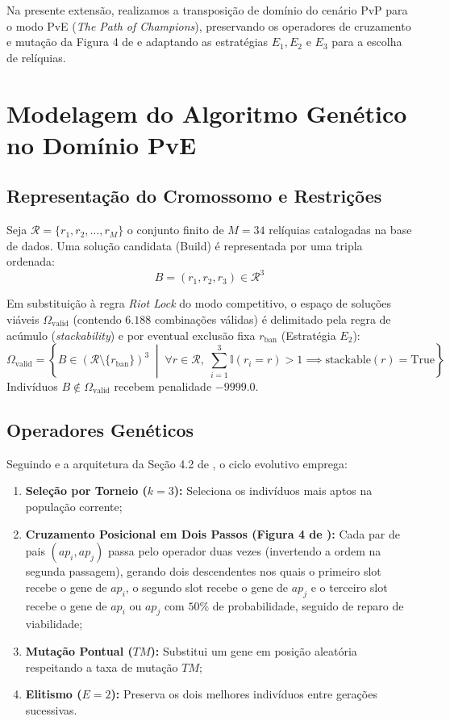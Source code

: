 \documentclass[12pt]{article}
\begin{document}
Na presente extensão, realizamos a transposição de domínio do cenário PvP para o modo PvE (\textit{The Path of Champions}), preservando os operadores de cruzamento e mutação da Figura 4 de \cite{balbinot2024} e adaptando as estratégias $E_1, E_2$ e $E_3$ para a escolha de relíquias.

\section{Modelagem do Algoritmo Genético no Domínio PvE}

\subsection{Representação do Cromossomo e Restrições}

Seja $\mathcal{R} = \{r_1, r_2, \dots, r_M\}$ o conjunto finito de $M = 34$ relíquias catalogadas na base de dados. Uma solução candidata (Build) é representada por uma tripla ordenada:
\begin{equation}
B = (r_1, r_2, r_3) \in \mathcal{R}^3
\end{equation}

Em substituição à regra \textit{Riot Lock} do modo competitivo, o espaço de soluções viáveis $\Omega_{\text{valid}}$ (contendo $6.188$ combinações válidas) é delimitado pela regra de acúmulo (\textit{stackability}) e por eventual exclusão fixa $r_{\text{ban}}$ (Estratégia $E_2$):
\begin{equation}
\Omega_{\text{valid}} = \left\{ B \in (\mathcal{R} \setminus \{r_{\text{ban}}\})^3 \;\middle|\; \forall r \in \mathcal{R}, \; \sum_{i=1}^3 \mathbb{I}(r_i = r) > 1 \implies \text{stackable}(r) = \text{True} \right\}
\end{equation}
Indivíduos $B \notin \Omega_{\text{valid}}$ recebem penalidade $-9999.0$.

\subsection{Operadores Genéticos}

Seguindo \cite{kramer2017} e a arquitetura da Seção 4.2 de \cite{balbinot2024}, o ciclo evolutivo emprega:
\begin{enumerate}
    \item \textbf{Seleção por Torneio ($k=3$):} Seleciona os indivíduos mais aptos na população corrente;
    \item \textbf{Cruzamento Posicional em Dois Passos (Figura 4 de \cite{balbinot2024}):} Cada par de pais $(ap_i, ap_j)$ passa pelo operador duas vezes (invertendo a ordem na segunda passagem), gerando dois descendentes nos quais o primeiro slot recebe o gene de $ap_i$, o segundo slot recebe o gene de $ap_j$ e o terceiro slot recebe o gene de $ap_i$ ou $ap_j$ com $50\%$ de probabilidade, seguido de reparo de viabilidade;
    \item \textbf{Mutação Pontual ($TM$):} Substitui um gene em posição aleatória respeitando a taxa de mutação $TM$;
    \item \textbf{Elitismo ($E=2$):} Preserva os dois melhores indivíduos entre gerações sucessivas.
\end{enumerate}
\end{document}
